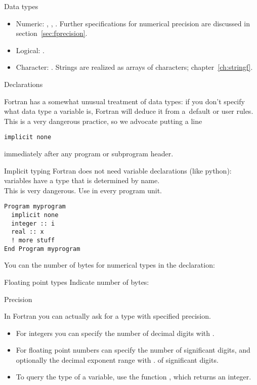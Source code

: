 \begin{block}{Data types}
  \label{sl:ftypes}
  \begin{itemize}
  \item Numeric: , ,
    . Further specifications for numerical
    precision are discussed in section~\ref{sec:fprecision}.
  \item Logical: .
  \item Character: . Strings are realized as
    arrays of characters; chapter~\ref{ch:stringf}.
  \end{itemize}  
\end{block}

 {Declarations}
\label{sec:ftype}

Fortran has a somewhat unusual treatment of data types: if you don't
specify what data type a variable is, Fortran will deduce it from
a~default or user rules. This is a very dangerous practice, so we
advocate putting a line
\begin{lstlisting}
implicit none
\end{lstlisting}
immediately after any program or subprogram header.

\begin{slide}{Implicit typing}
  \label{sl:fimplicit}
  Fortran does not need variable declarations (like python):\\
  variables have a type that is determined by name.\\
  This is very dangerous. Use 
  in every program unit.
\begin{lstlisting}
Program myprogram
  implicit none
  integer :: i
  real :: x
  ! more stuff
End Program myprogram
\end{lstlisting}
\end{slide}

You can the number of bytes for numerical types in the declaration:
%

\begin{slide}{Floating point types}
  \label{sl:ffloat}
  Indicate number of bytes:
\end{slide}

 {Precision}
\label{sec:fprecision}

In Fortran you can actually ask for a type with specified precision.
\begin{itemize}
\item For integers you can specify the number of decimal digits with
  .
\item For floating point numbers can specify the number of
  significant digits, and optionally the decimal exponent range with
  .
  of significant digits.
\item To query the type of a variable, use the function
  , which returns an integer.
\end{itemize}

